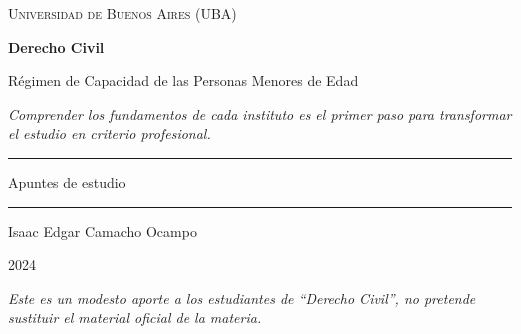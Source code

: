 \documentclass[12pt,oneside]{book}
\newcommand{\universidad}{Universidad de Buenos Aires (UBA)}
\newcommand{\materia}{Derecho Civil}
\newcommand{\titulo}{Régimen de Capacidad de las Personas Menores de Edad}
\newcommand{\autor}{Isaac Edgar Camacho Ocampo}
\newcommand{\anio}{2024}
\begin{document}
\begin{titlepage}

\thispagestyle{empty}

\begin{center}

\vspace*{1cm}

{\large \textsc{\universidad}}

\vspace{3cm}

{\Huge \textbf{\materia}}

\vspace{1cm}

{\LARGE \titulo}

\vspace{0.8cm}

\textit{Comprender los fundamentos de cada instituto es el primer paso para transformar el estudio en criterio profesional.}

\vspace{1.2cm}

\rule{0.70\textwidth}{0.5pt}

\vspace{0.5cm}

{\large Apuntes de estudio}

\vspace{0.5cm}

\rule{0.70\textwidth}{0.5pt}

\vfill

{\large \autor}

\vspace{0.3cm}

{\large \anio}

\end{center}

\vfill

\begin{flushleft}
\textit{Este es un modesto aporte a los estudiantes de \textquotedblleft Derecho Civil\textquotedblright, no pretende sustituir el material oficial de la materia.}
\end{flushleft}

\end{titlepage}

\tableofcontents
\end{document}
